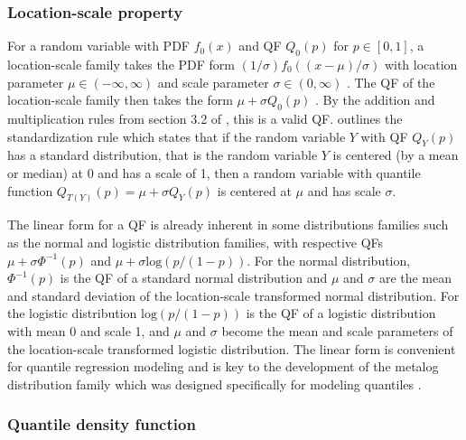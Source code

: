 \documentclass[preprint,12pt,authoryear]{elsarticle}
\newcommand{\1}[1]{\mathds{1}\left[#1\right]}
\begin{document}
\subsubsection{Location-scale property}
For a random variable with PDF $f_0\left(x\right)$ and 
QF $Q_0\left(p\right)$ for $p \in \left[0,1\right]$, a 
location-scale family takes the PDF form 
$\left(1/\sigma\right)f_0\left(\left(x - \mu\right)/\sigma\right)$ 
with location parameter 
$\mu \in \left( -\infty, \infty \right)$ and scale parameter 
$\sigma \in \left(0, \infty \right)$ \cite[]{casella2002statistical}. 
The QF of the 
location-scale family then takes the form $\mu + \sigma Q_0\left(p \right)$ 
\cite[]{parzen2004quantile}. By the addition and multiplication rules from 
section 3.2 of \cite{gilchrist2000statistical}, 
this is a valid QF. \cite{gilchrist2000statistical} outlines the 
standardization rule which states that if the random variable $Y$ with QF 
$Q_Y\left(p \right)$ has a standard distribution, that is the 
random variable $Y$ is 
centered (by a mean or median) at 0 and has a scale of 1, then a random 
variable with quantile function 
$Q_{T\left(Y \right)}\left(p \right) = \mu + \sigma Q_Y\left(p \right)$ is 
centered at $\mu$ and has scale $\sigma$.

The linear form for a QF is already inherent in some distributions families 
such as the normal and logistic distribution families, with respective QFs 
$\mu + \sigma \Phi^{-1} \left(p \right)$ and 
$\mu + \sigma \text{log}\left(p/ \left(1 - p \right) \right)$. For the
normal distribution, 
$\Phi^{-1}\left(p \right)$ is the QF of a standard normal distribution 
and $\mu$ and $\sigma$ are the mean and standard deviation of the 
location-scale transformed normal distribution. For the logistic distribution 
$\text{log}\left(p/\left(1-p \right) \right)$ 
is the QF of a logistic distribution with mean 0 and 
scale 1, and $\mu$ and $\sigma$ become the mean and scale parameters of the 
location-scale transformed logistic distribution. The linear form is convenient 
for quantile regression modeling and is key to the development of the metalog 
distribution family which was designed specifically for modeling quantiles 
\cite[]{keelin2016metalog}. 

\subsubsection{Quantile density function}
\end{document}

